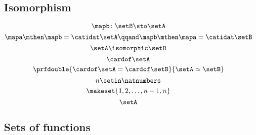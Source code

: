 \begin{forslides}
    \subsection{Isomorphism}

    \begin{equation}
        \label{eq:slides_session2_148}
        \mapb \colon \setB \sto \setA
    \end{equation}
    \begin{equation}
        \label{eq:slides_session2_149}
        \mapa \mthen \mapb = \catidat\setA
        \qqand
        \mapb \mthen \mapa = \catidat\setB
    \end{equation}
    \begin{equation}
        \label{eq:slides_session2_150}
        \setA \isomorphic \setB
    \end{equation}
    \begin{equation}
        \label{eq:slides_session2_151}
        \cardof \setA
    \end{equation}
    \begin{equation}
        \label{eq:slides_session2_152}
        \prfdouble{
            \cardof \setA   = \cardof \setB
        }{
            \setA \simeq \setB
        }
    \end{equation}
    \begin{equation}
        \label{eq:slides_session2_153}
        n \setin \natnumbers
    \end{equation}
    \begin{equation}
        \label{eq:slides_session2_154}
        \makeset{1,2, \dots, n-1, n}
    \end{equation}
    \begin{equation}
        \label{eq:slides_session2_155}
        \setA
    \end{equation}

    \subsection{Sets of functions}


\end{forslides}
